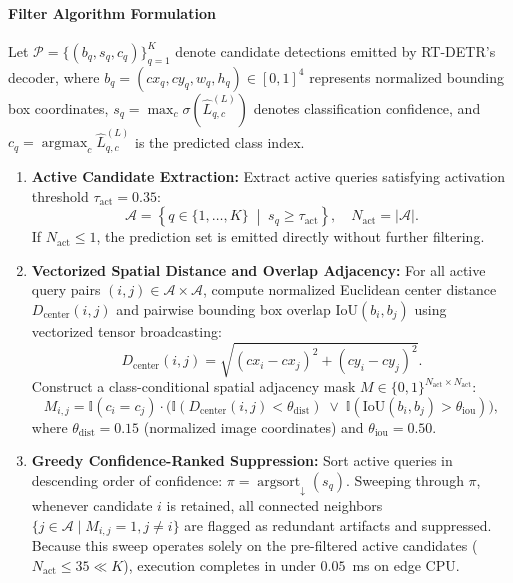 \documentclass[preprint,12pt]{elsarticle}
\begin{document}
\paragraph{Filter Algorithm Formulation}
Let $\mathcal{P} = \{(b_q, s_q, c_q)\}_{q=1}^K$ denote candidate detections emitted by RT-DETR's decoder, where $b_q = (cx_q, cy_q, w_q, h_q) \in [0, 1]^4$ represents normalized bounding box coordinates, $s_q = \max_c \sigma(\hat{L}_{q, c}^{(L)})$ denotes classification confidence, and $c_q = \operatorname{argmax}_c \hat{L}_{q, c}^{(L)}$ is the predicted class index.
\begin{enumerate}
    \item \textbf{Active Candidate Extraction:} Extract active queries satisfying activation threshold $\tau_{\mathrm{act}} = 0.35$:
    \begin{equation}
        \mathcal{A} = \left\{ q \in \{1, \dots, K\} \;\middle|\; s_q \ge \tau_{\mathrm{act}} \right\}, \quad N_{\mathrm{act}} = |\mathcal{A}|.
    \end{equation}
    If $N_{\mathrm{act}} \le 1$, the prediction set is emitted directly without further filtering.
    \item \textbf{Vectorized Spatial Distance and Overlap Adjacency:} For all active query pairs $(i, j) \in \mathcal{A} \times \mathcal{A}$, compute normalized Euclidean center distance $D_{\mathrm{center}}(i, j)$ and pairwise bounding box overlap $\mathrm{IoU}(b_i, b_j)$ using vectorized tensor broadcasting:
    \begin{equation}
        D_{\mathrm{center}}(i, j) = \sqrt{(cx_i - cx_j)^2 + (cy_i - cy_j)^2}.
    \end{equation}
    Construct a class-conditional spatial adjacency mask $M \in \{0, 1\}^{N_{\mathrm{act}} \times N_{\mathrm{act}}}$:
    \begin{equation}
        M_{i, j} = \mathbb{I}(c_i = c_j) \cdot \Big( \mathbb{I}(D_{\mathrm{center}}(i, j) < \theta_{\mathrm{dist}}) \;\lor\; \mathbb{I}(\mathrm{IoU}(b_i, b_j) > \theta_{\mathrm{iou}}) \Big),
    \end{equation}
    where $\theta_{\mathrm{dist}} = 0.15$ (normalized image coordinates) and $\theta_{\mathrm{iou}} = 0.50$.
    \item \textbf{Greedy Confidence-Ranked Suppression:} Sort active queries in descending order of confidence: $\pi = \operatorname{argsort}_{\downarrow}(s_q)$. Sweeping through $\pi$, whenever candidate $i$ is retained, all connected neighbors $\{j \in \mathcal{A} \mid M_{i, j} = 1, j \ne i\}$ are flagged as redundant artifacts and suppressed. Because this sweep operates solely on the pre-filtered active candidates ($N_{\mathrm{act}} \le 35 \ll K$), execution completes in under $0.05$~ms on edge CPU.
\end{enumerate}
\end{document}
